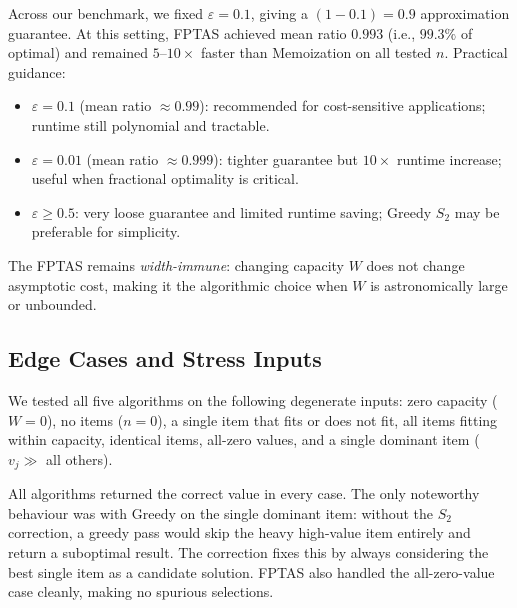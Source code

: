 \documentclass[11pt, a4paper]{article}
\begin{document}
Across our benchmark, we fixed $\varepsilon=0.1$, giving a $(1{-}0.1)=0.9$
approximation guarantee. At this setting, FPTAS achieved mean ratio $0.993$
(i.e., $99.3\%$ of optimal) and remained $5$--$10\times$ faster than
Memoization on all tested $n$. Practical guidance:
\begin{itemize}
\item $\varepsilon=0.1$ (mean ratio $\approx 0.99$): recommended for cost-sensitive
  applications; runtime still polynomial and tractable.
\item $\varepsilon=0.01$ (mean ratio $\approx 0.999$): tighter guarantee but
  $10\times$ runtime increase; useful when fractional optimality is critical.
\item $\varepsilon \ge 0.5$: very loose guarantee and limited runtime saving;
  Greedy $S_2$ may be preferable for simplicity.
\end{itemize}
The FPTAS remains \emph{width-immune}: changing capacity $W$ does not change
asymptotic cost, making it the algorithmic choice when $W$ is astronomically
large or unbounded.

\subsection{Edge Cases and Stress Inputs}
We tested all five algorithms on the following degenerate inputs: zero capacity
($W=0$), no items ($n=0$), a single item that fits or does not fit, all items
fitting within capacity, identical items, all-zero values, and a single
dominant item ($v_j \gg$ all others).

All algorithms returned the correct value in every case. The only noteworthy
behaviour was with Greedy on the single dominant item: without the $S_2$
correction, a greedy pass would skip the heavy high-value item entirely and
return a suboptimal result. The correction fixes this by always considering the
best single item as a candidate solution. FPTAS also handled the all-zero-value
case cleanly, making no spurious selections.
\end{document}
